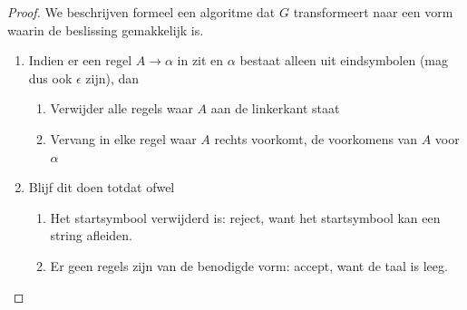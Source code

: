 \begin{proof}
	We beschrijven formeel een algoritme dat $G$ transformeert naar een vorm waarin de beslissing gemakkelijk is.
	\begin{enumerate}
		\item Indien er een regel $A \rightarrow \alpha$ in zit en $\alpha$ bestaat alleen uit eindsymbolen (mag dus ook $\epsilon$ zijn), dan
		\begin{enumerate}
			\item Verwijder alle regels waar $A$ aan de linkerkant staat
			\item Vervang in elke regel waar $A$ rechts voorkomt, de voorkomens van $A$ voor $\alpha$
		\end{enumerate}
		\item Blijf dit doen totdat ofwel
		\begin{enumerate}
			\item Het startsymbool verwijderd is: reject, want het startsymbool kan een string afleiden.
			\item Er geen regels zijn van de benodigde vorm: accept, want de taal is leeg.
		\end{enumerate}
	\end{enumerate}
\end{proof}
